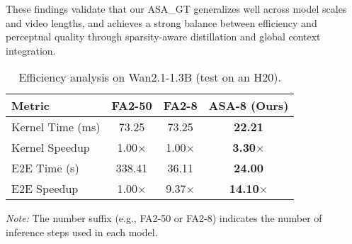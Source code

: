 \documentclass[letterpaper]{article} %
\begin{document}
These findings validate that our ASA\_GT generalizes well across model scales and video lengths, and achieves a strong balance between efficiency and perceptual quality through sparsity-aware distillation and global context integration.


\begin{table}[ht]
\centering
\caption{Efficiency analysis on Wan2.1-1.3B (test on an H20).}
\label{tab:efficiency}
\small
\begin{tabular}{lccc}
\toprule
\textbf{Metric} & \textbf{FA2-50} & \textbf{FA2-8} & \textbf{ASA-8 (Ours)} \\
\midrule
Kernel Time (ms) & 73.25 & 73.25 & \textbf{22.21} \\
Kernel Speedup & 1.00$\times$ & 1.00$\times$ & \textbf{3.30$\times$} \\
E2E Time (s) & 338.41 & 36.11 & \textbf{24.00} \\
E2E Speedup & 1.00$\times$ & 9.37$\times$ & \textbf{14.10$\times$} \\
\bottomrule
\end{tabular}

\footnotesize\textit{Note:} The number suffix (e.g., FA2-50 or FA2-8) indicates the number of inference steps used in each model.
\end{table}
\end{document}
